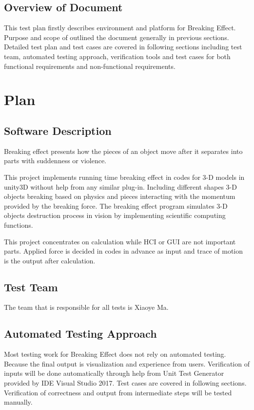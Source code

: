 \documentclass[12pt, titlepage]{article}
\begin{document}
\subsection{Overview of Document}

This test plan firstly describes environment and platform for Breaking Effect. Purpose and scope of outlined the document generally in previous sections. Detailed test plan and test cases are covered in following sections including test team, automated testing approach, verification tools and test cases for both functional requirements and non-functional requirements.

\section{Plan}
	
\subsection{Software Description}

Breaking effect presents how the pieces of an object move after it separates into parts with
suddenness or violence.

This project implements running time breaking effect in codes for 3-D models in unity3D without help from any similar plug-in. Including different shapes 3-D objects breaking based on physics and pieces interacting with the momentum provided by the breaking force. The breaking effect program simulates 3-D objects destruction process in vision by implementing scientific computing functions.

This project concentrates on calculation while
HCI or GUI are not important parts. Applied force is decided in codes in advance as input
and trace of motion is the output after calculation.

\subsection{Test Team}
The team that is responsible for all tests is Xiaoye Ma.
\subsection{Automated Testing Approach}

Most testing work for Breaking Effect does not rely on automated testing. Because the final output is visualization and experience from users. Verification of inputs will be done automatically through help from Unit Test Generator provided by IDE Visual Studio 2017. Test cases are covered in following sections. Verification of correctness and output from intermediate steps will be tested manually.  
\end{document}
